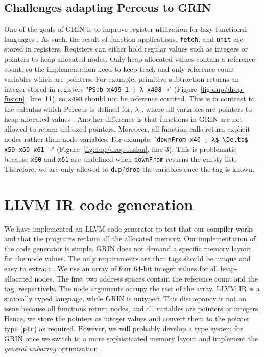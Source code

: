 \documentclass[9pt, twocolumn]{article}
\begin{document}
\subsection{Challenges adapting Perceus to GRIN}
\label{sec:perceus-challanges}
One of the goals of GRIN is to improve register utilization for lazy functional languages \mbox{\citep{boquist1999}}.
As such, the result of function applications, \lstinline{fetch}, and \lstinline{unit} are stored in registers.
Reqisters can either hold regular values such as integers or pointers to heap allocated nodes.
Only heap allocated values contain a reference count, so the implementation need to keep track and only reference count variables which are pointers. 
For example, primitive subtraction returns an integer stored in registers "\lstinline{PSub x499 1 ; λ x498 →}" \mbox{(Figure \ref{fig:dup/drop-fusion}, line 11)}, so \lstinline{x498} should not be reference counted.
This is in contrast to the calculus which Perceus is defined for, $λ₁$, where all variables are pointers to heap-allocated values \citep{reinking2021}.
Another difference is that functions in GRIN are not allowed to return unboxed pointers. 
Moreover, all function calls return explicit nodes rather than node variables. 
For example: "\lstinline{downFrom x40 ; λ$_\Delta$ x59 x60 x61 →}" (\mbox{Figure \ref{fig:dup/drop-fusion}}, line 3).
This is problematic because \lstinline{x60} and \lstinline{x61} are undefined when \lstinline{downFrom} returns the empty list.
Therefore, we are only allowed to \lstinline{dup}/\lstinline{drop} the variables once the tag is known.

\section{LLVM IR code generation}
\label{sec:llvm-codegen}
We have implemented an LLVM code generator to test that our compiler works and that the programs reclaim all the allocated memory. 
Our implementation of the code generator is simple. 
GRIN does not demand a specific memory layout for the node values.
The only requirements are that tags should be unique and easy to extract \citep{boquist1999}.
We use an array of four 64-bit integer values for all heap-allocated nodes. 
The first two address spaces contain the reference count and the tag, respectively.
The node arguments occupy the rest of the array.
LLVM IR is a statically typed language, while GRIN is untyped.
This discrepancy is not an issue because all functions return nodes, and all variables are pointers or integers.
Hence, we store the pointers as integer values and convert them to the pointer type (\lstinline{ptr}) as required.
However, we will probably develop a type system for GRIN once we switch to a more sophisticated memory layout and implement the \emph{general unboxing} optimization \citep{boquist1999}.
\end{document}
